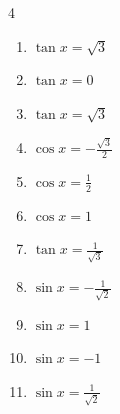 \begin{multicols}{4}
\begin{enumerate}

  \item $\displaystyle \tan{x}  = \sqrt{3}$


  \item $\displaystyle \tan{x}  = 0$


  \item $\displaystyle \tan{x}  = \sqrt{3}$


\columnbreak %

  \item $\displaystyle \cos{x}  = -\frac{\sqrt{3}}{2}$


  \item $\displaystyle \cos{x}  = \frac{1}{2}$


  \item $\displaystyle \cos{x}  = 1$


  \item $\displaystyle \tan{x}  = \frac{1}{\sqrt{3}}$


  \item $\displaystyle \sin{x}  = -\frac{1}{\sqrt{2}}$


  \item $\displaystyle \sin{x}  = 1$


  \item $\displaystyle \sin{x}  = -1$


  \item $\displaystyle \sin{x}  = \frac{1}{\sqrt{2}}$



\end{enumerate}
\end{multicols}
